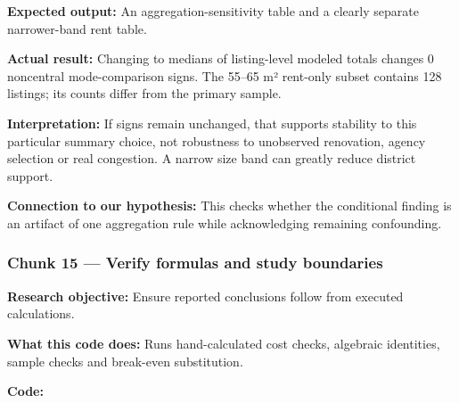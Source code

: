 \documentclass[
]{article}
\newenvironment{Shaded}{\begin{snugshade}}{\end{snugshade}}
\newcommand{\FunctionTok}[1]{\textcolor[rgb]{0.13,0.29,0.53}{\textbf{#1}}}
\newcommand{\NormalTok}[1]{#1}
\newcommand{\OtherTok}[1]{\textcolor[rgb]{0.56,0.35,0.01}{#1}}
\newcommand{\SpecialCharTok}[1]{\textcolor[rgb]{0.81,0.36,0.00}{\textbf{#1}}}
\newcommand{\StringTok}[1]{\textcolor[rgb]{0.31,0.60,0.02}{#1}}
\begin{document}
\begin{Shaded}
\end{Shaded}

\textbf{Expected output:} An aggregation-sensitivity table and a clearly
separate narrower-band rent table.

\textbf{Actual result:} Changing to medians of listing-level modeled
totals changes 0 noncentral mode-comparison signs. The 55--65 m²
rent-only subset contains 128 listings; its counts differ from the
primary sample.

\textbf{Interpretation:} If signs remain unchanged, that supports
stability to this particular summary choice, not robustness to
unobserved renovation, agency selection or real congestion. A narrow
size band can greatly reduce district support.

\textbf{Connection to our hypothesis:} This checks whether the
conditional finding is an artifact of one aggregation rule while
acknowledging remaining confounding.

\subsubsection{Chunk 15 --- Verify formulas and study
boundaries}\label{chunk-15-verify-formulas-and-study-boundaries}

\textbf{Research objective:} Ensure reported conclusions follow from
executed calculations.

\textbf{What this code does:} Runs hand-calculated cost checks,
algebraic identities, sample checks and break-even substitution.

\textbf{Code:}
\end{document}
